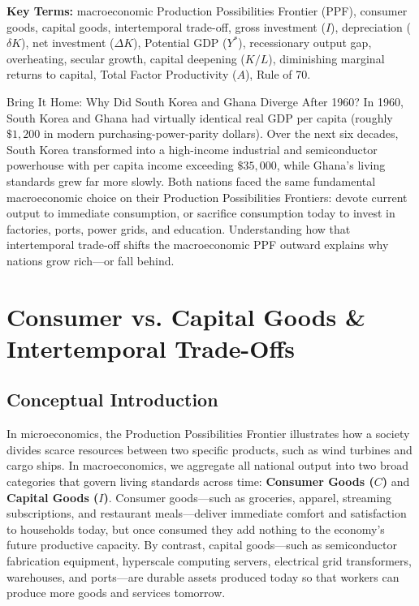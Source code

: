 \documentclass[11pt,letterpaper]{article}
\begin{document}
\noindent\textbf{Key Terms:} macroeconomic Production Possibilities Frontier (PPF), consumer goods, capital goods, intertemporal trade-off, gross investment ($I$), depreciation ($\delta K$), net investment ($\Delta K$), Potential GDP ($Y^*$), recessionary output gap, overheating, secular growth, capital deepening ($K/L$), diminishing marginal returns to capital, Total Factor Productivity ($A$), Rule of 70.

\begin{examplecase}{Bring It Home: Why Did South Korea and Ghana Diverge After 1960?}
In 1960, South Korea and Ghana had virtually identical real GDP per capita (roughly $\$1,200$ in modern purchasing-power-parity dollars). Over the next six decades, South Korea transformed into a high-income industrial and semiconductor powerhouse with per capita income exceeding $\$35,000$, while Ghana's living standards grew far more slowly. Both nations faced the same fundamental macroeconomic choice on their Production Possibilities Frontiers: devote current output to immediate consumption, or sacrifice consumption today to invest in factories, ports, power grids, and education. Understanding how that intertemporal trade-off shifts the macroeconomic PPF outward explains why nations grow rich—or fall behind.
\end{examplecase}

\section{Consumer vs. Capital Goods \& Intertemporal Trade-Offs}

\subsection*{Conceptual Introduction}
In microeconomics, the Production Possibilities Frontier illustrates how a society divides scarce resources between two specific products, such as wind turbines and cargo ships. In macroeconomics, we aggregate all national output into two broad categories that govern living standards across time: \textbf{Consumer Goods ($C$)} and \textbf{Capital Goods ($I$)}. Consumer goods—such as groceries, apparel, streaming subscriptions, and restaurant meals—deliver immediate comfort and satisfaction to households today, but once consumed they add nothing to the economy's future productive capacity. By contrast, capital goods—such as semiconductor fabrication equipment, hyperscale computing servers, electrical grid transformers, warehouses, and ports—are durable assets produced today so that workers can produce more goods and services tomorrow.
\end{document}
